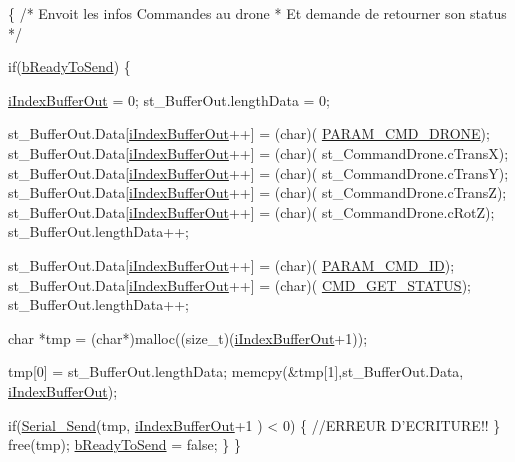 \begin{DoxyCode}
\{
    \textcolor{comment}{/* Envoit les infos Commandes au drone}
\textcolor{comment}{     * Et demande de retourner son status}
\textcolor{comment}{     */}

    \textcolor{keywordflow}{if}(\hyperlink{classZigBee_ac954bdd2f3b1c5bcfe11563765f10878}{bReadyToSend}) \{

        \hyperlink{classZigBee_aa510069113962d7a107f27c4d798d08c}{iIndexBufferOut} = 0;
        st\_BufferOut.lengthData = 0;

        st\_BufferOut.Data[\hyperlink{classZigBee_aa510069113962d7a107f27c4d798d08c}{iIndexBufferOut}++] = (char)(
      \hyperlink{typdefUart_8h_a7fdf1e7bfbebe0c7a2eb84a10e069632ab52e565f8ee0b43ab5fdba5dd32ef949}{PARAM\_CMD\_DRONE});
        st\_BufferOut.Data[\hyperlink{classZigBee_aa510069113962d7a107f27c4d798d08c}{iIndexBufferOut}++] = (char)(
      st\_CommandDrone.cTransX);
        st\_BufferOut.Data[\hyperlink{classZigBee_aa510069113962d7a107f27c4d798d08c}{iIndexBufferOut}++] = (char)(
      st\_CommandDrone.cTransY);
        st\_BufferOut.Data[\hyperlink{classZigBee_aa510069113962d7a107f27c4d798d08c}{iIndexBufferOut}++] = (char)(
      st\_CommandDrone.cTransZ);
        st\_BufferOut.Data[\hyperlink{classZigBee_aa510069113962d7a107f27c4d798d08c}{iIndexBufferOut}++] = (char)(
      st\_CommandDrone.cRotZ);
        st\_BufferOut.lengthData++;

        st\_BufferOut.Data[\hyperlink{classZigBee_aa510069113962d7a107f27c4d798d08c}{iIndexBufferOut}++] = (char)(
      \hyperlink{typdefUart_8h_a7fdf1e7bfbebe0c7a2eb84a10e069632a653f0737cc2f062b0f5563ee5c9023e4}{PARAM\_CMD\_ID});
        st\_BufferOut.Data[\hyperlink{classZigBee_aa510069113962d7a107f27c4d798d08c}{iIndexBufferOut}++] = (char)(
      \hyperlink{typdefUart_8h_aa8a212aca1d1f49ff85fe2ac4b74cbb6aa9f5e1d3fa7a48a053cb78acdf95e57a}{CMD\_GET\_STATUS});
        st\_BufferOut.lengthData++;

        \textcolor{keywordtype}{char} *tmp = (\textcolor{keywordtype}{char}*)malloc((\textcolor{keywordtype}{size\_t})(\hyperlink{classZigBee_aa510069113962d7a107f27c4d798d08c}{iIndexBufferOut}+1));

        tmp[0] = st\_BufferOut.lengthData;
        memcpy(&tmp[1],st\_BufferOut.Data, \hyperlink{classZigBee_aa510069113962d7a107f27c4d798d08c}{iIndexBufferOut});

        \textcolor{keywordflow}{if}(\hyperlink{classUart_ace4b7eaee7374cac2c91ca627b2a78b6}{Serial\_Send}(tmp, \hyperlink{classZigBee_aa510069113962d7a107f27c4d798d08c}{iIndexBufferOut}+1 ) < 0) 
      \{
            \textcolor{comment}{//ERREUR D'ECRITURE!!}
        \}
        free(tmp);
        \hyperlink{classZigBee_ac954bdd2f3b1c5bcfe11563765f10878}{bReadyToSend} = \textcolor{keyword}{false};
    \}
\}
\end{DoxyCode}
